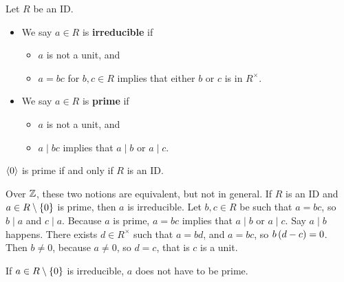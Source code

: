 \begin{definition}
Let $ R $ be an ID.
\begin{itemize}
\item We say $ a \in R $ is \textbf{irreducible} if
\begin{itemize}
\item $ a $ is not a unit, and
\item $ a = bc $ for $ b, c \in R $ implies that either $ b $ or $ c $ is in $ R^\times $.
\end{itemize}
\item We say $ a \in R $ is \textbf{prime} if
\begin{itemize}
\item $ a $ is not a unit, and
\item $ a \mid bc $ implies that $ a \mid b $ or $ a \mid c $.
\end{itemize}
\end{itemize}
\end{definition}

$ \left\langle 0 \right\rangle $ is prime if and only if $ R $ is an ID.

\begin{remark*}
Over $ \mathbb{Z} $, these two notions are equivalent, but not in general. If $ R $ is an ID and $ a \in R \setminus \cbr{0} $ is prime, then $ a $ is irreducible. Let $ b, c \in R $ be such that $ a = bc $, so $ b \mid a $ and $ c \mid a $. Because $ a $ is prime, $ a = bc $ implies that $ a \mid b $ or $ a \mid c $. Say $ a \mid b $ happens. There exists $ d \in R^\times $ such that $ a = bd $, and $ a = bc $, so $ b\br{d - c} = 0 $. Then $ b \ne 0 $, because $ a \ne 0 $, so $ d = c $, that is $ c $ is a unit.
\end{remark*}

\begin{remark*}
If $ a \in R \setminus \cbr{0} $ is irreducible, $ a $ does not have to be prime.
\end{remark*}

